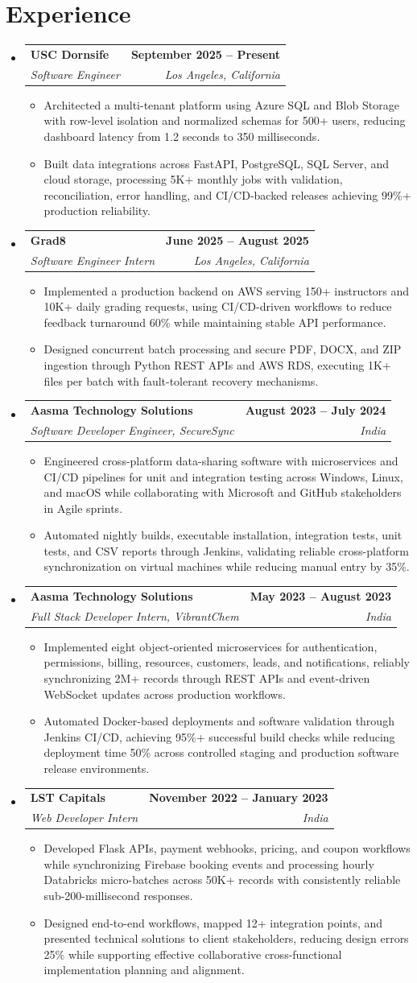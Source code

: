 \documentclass[letterpaper,10pt]{article}
\makeatletter
\newcommand{\itemTail}{\vspace{-4pt}}
\newcommand{\sectionGap}{\vspace{-8pt}}
\newcommand{\roleGap}{\vspace{2pt}}
\newcommand{\resumeItem}[1]{\item\small{{#1 \itemTail}}}
\newcommand{\resumeSubheading}[4]{\vspace{-1pt}\item\begin{tabular*}{1.0\textwidth}[t]{l@{\extracolsep{\fill}}r}\textbf{#1} & \textbf{\small #2} \\\textit{\small#3} & \textit{\small #4} \\\end{tabular*}\vspace{-2pt}}
\newcommand{\resumeSubHeadingListStart}{\begin{itemize}[leftmargin=0.0in, label={}]}
\newcommand{\resumeSubHeadingListEnd}{\end{itemize}}
\newcommand{\resumeItemListStart}{\begin{itemize}[leftmargin=0.15in,label=\textbullet,itemsep=3pt,topsep=0pt,parsep=0pt,partopsep=0pt]}
\newcommand{\resumeItemListEnd}{\end{itemize}\vspace{-4pt}}
\makeatother
\begin{document}
\section{Experience}
\resumeSubHeadingListStart
\resumeSubheading{USC Dornsife}{September 2025 -- Present}{Software Engineer}{Los Angeles, California}
\resumeItemListStart
\resumeItem{Architected a multi-tenant platform using Azure SQL and Blob Storage with row-level isolation and normalized schemas for 500+ users, reducing dashboard latency from 1.2 seconds to 350 milliseconds.}
\resumeItem{Built data integrations across FastAPI, PostgreSQL, SQL Server, and cloud storage, processing 5K+ monthly jobs with validation, reconciliation, error handling, and CI/CD-backed releases achieving 99\%+ production reliability.}
\resumeItemListEnd
\roleGap
\resumeSubheading{Grad8}{June 2025 -- August 2025}{Software Engineer Intern}{Los Angeles, California}
\resumeItemListStart
\resumeItem{Implemented a production backend on AWS serving 150+ instructors and 10K+ daily grading requests, using CI/CD-driven workflows to reduce feedback turnaround 60\% while maintaining stable API performance.}
\resumeItem{Designed concurrent batch processing and secure PDF, DOCX, and ZIP ingestion through Python REST APIs and AWS RDS, executing 1K+ files per batch with fault-tolerant recovery mechanisms.}
\resumeItemListEnd
\roleGap
\resumeSubheading{Aasma Technology Solutions}{August 2023 -- July 2024}{Software Developer Engineer, SecureSync}{India}
\resumeItemListStart
\resumeItem{Engineered cross-platform data-sharing software with microservices and CI/CD pipelines for unit and integration testing across Windows, Linux, and macOS while collaborating with Microsoft and GitHub stakeholders in Agile sprints.}
\resumeItem{Automated nightly builds, executable installation, integration tests, unit tests, and CSV reports through Jenkins, validating reliable cross-platform synchronization on virtual machines while reducing manual entry by 35\%.}
\resumeItemListEnd
\roleGap
\resumeSubheading{Aasma Technology Solutions}{May 2023 -- August 2023}{Full Stack Developer Intern, VibrantChem}{India}
\resumeItemListStart
\resumeItem{Implemented eight object-oriented microservices for authentication, permissions, billing, resources, customers, leads, and notifications, reliably synchronizing 2M+ records through REST APIs and event-driven WebSocket updates across production workflows.}
\resumeItem{Automated Docker-based deployments and software validation through Jenkins CI/CD, achieving 95\%+ successful build checks while reducing deployment time 50\% across controlled staging and production software release environments.}
\resumeItemListEnd
\roleGap
\resumeSubheading{LST Capitals}{November 2022 -- January 2023}{Web Developer Intern}{India}
\resumeItemListStart
\resumeItem{Developed Flask APIs, payment webhooks, pricing, and coupon workflows while synchronizing Firebase booking events and processing hourly Databricks micro-batches across 50K+ records with consistently reliable sub-200-millisecond responses.}
\resumeItem{Designed end-to-end workflows, mapped 12+ integration points, and presented technical solutions to client stakeholders, reducing design errors 25\% while supporting effective collaborative cross-functional implementation planning and alignment.}
\resumeItemListEnd
\resumeSubHeadingListEnd
\sectionGap
\end{document}
